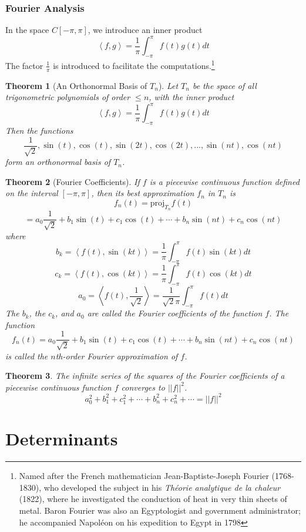 \documentclass[10pt]{report}
\newtheorem{thm3}{Theorem}[subsection]
\begin{document}
\subsection{Fourier Analysis}
In the space $C[-\pi, \pi]$, we introduce an inner product
$$\left<f,g\right> = \frac{1}{\pi}\int_{-\pi}^\pi f(t)g(t)dt$$
The factor $\frac{1}{\pi}$ is introduced to facilitate the computations.\footnote{Named after the French mathematician Jean-Baptiste-Joseph Fourier (1768-1830), who developed the subject in his \textit{Th\'{e}orie analytique de la chaleur} (1822), where he investigated the conduction of heat in very thin sheets of metal. Baron Fourier was also an Egyptologist and government administrator; he accompanied Napol\'{e}on on his expedition to Egypt in 1798}
\begin{thm3}[An Orthonormal Basis of $T_n$]
Let $T_n$ be the space of all trigonometric polynomials of order $\leq n$, with the inner product
$$\left<f,g\right> = \frac{1}{\pi}\int_{-\pi}^\pi f(t)g(t)dt$$
Then the functions
$$\frac{1}{\sqrt{2}}, \sin(t), \cos(t), \sin(2t),\cos(2t), ..., \sin(nt), \cos(nt)$$
form an orthonormal basis of $T_n$.
\end{thm3}
\begin{thm3}[Fourier Coefficients]
If $f$ is a piecewise continuous function defined on the interval $[-\pi, \pi]$, then its best approximation $f_n$ in $T_n$ is
$$f_n(t)=\text{proj}_{T_n}f(t)$$
$$=a_0\frac{1}{\sqrt{2}}+b_1\sin(t) + c_1\cos(t) + \cdots + b_n\sin(nt) + c_n\cos(nt)$$
where
$$b_k = \left<f(t),\sin(kt)\right> = \frac{1}{\pi}\int_{-\pi}^\pi f(t)\sin(kt)dt$$
$$c_k = \left< f(t),\cos(kt) \right> = \frac{1}{\pi}\int_{-\pi}^\pi f(t)\cos(kt)dt$$
$$a_0 = \left< f(t),\frac{1}{\sqrt{2}} \right> = \frac{1}{\sqrt{2}\pi}\int_{-\pi}^\pi f(t)dt$$
The $b_k$, the $c_k$, and $a_0$ are called the Fourier coefficients of the function $f$. The function
$$f_n(t)=a_0\frac{1}{\sqrt{2}}+b_1\sin(t) + c_1\cos(t) + \cdots + b_n\sin(nt) + c_n\cos(nt)$$
is called the $n$th-order Fourier approximation of $f$.
\end{thm3}
\begin{thm3}
The infinite series of the squares of the Fourier coefficients of a piecewise continuous function $f$ converges to $||f||^2$.
$$a_0^2 +b_1^2 +c_1^2 + \cdots + b_n^2 + c_n^2 + \cdots = ||f||^2$$
\end{thm3}

\chapter{Determinants}
\end{document}
